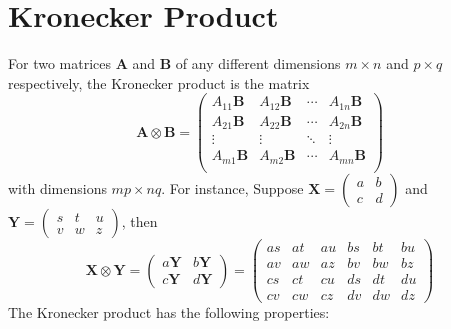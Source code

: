 \documentclass[conference,final,11pt,technote,onecolumn]{IEEEtran}\usepackage[]{graphicx}\usepackage[]{color}
\begin{document}
\section{Kronecker Product}
\label{term:kronecker_product}
For two matrices $\mathbf{A}$ and $\mathbf{B}$ of any different dimensions $m \times n$ and $p\times q$ respectively, the Kronecker product is the matrix 
\[ \mathbf{A} \otimes \mathbf{B} = \begin{pmatrix}
A_{11}\mathbf{B} & A_{12}\mathbf{B} & \cdots & A_{1n}\mathbf{B} \\
 A_{21}\mathbf{B} & A_{22}\mathbf{B} & \cdots & A_{2n}\mathbf{B} \\
\vdots & \vdots & \ddots & \vdots \\
 A_{m1}\mathbf{B} & A_{m2}\mathbf{B} & \cdots & A_{mn}\mathbf{B} \\
\end{pmatrix} \]
with dimensions $mp \times nq$. For instance, Suppose $\mathbf{X} = \begin{pmatrix}a & b\\ c & d\end{pmatrix}$ and $\mathbf{Y} = \begin{pmatrix}s & t & u\\ v & w & z\end{pmatrix}$, then
\[ 
\mathbf{X} \otimes \mathbf{Y} = \begin{pmatrix}
a\mathbf{Y} & b\mathbf{Y}\\ c\mathbf{Y} & d\mathbf{Y}
\end{pmatrix} = \begin{pmatrix}
as & at & au & bs & bt & bu\\
av & aw & az & bv & bw & bz\\
cs & ct & cu & ds & dt & du\\
cv & cw & cz & dv & dw & dz
\end{pmatrix}
\]
The Kronecker product has the following properties\cite{minka2000old}\cite{petersen2008matrix}:
\end{document}
